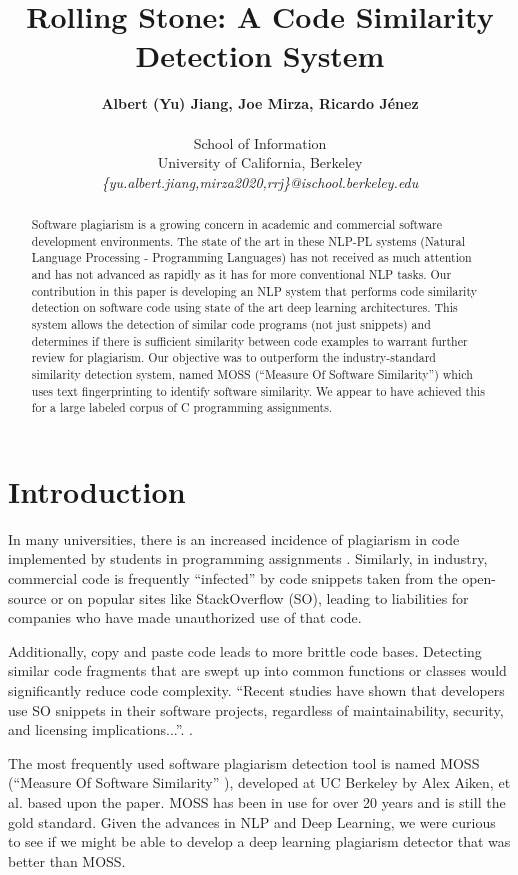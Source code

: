 \documentclass[twocolumn]{article}
\title{\Large \textbf{Rolling Stone: A Code Similarity Detection System}}
\author{\textbf{Albert (Yu) Jiang, Joe Mirza, Ricardo J\'enez} \\
\\
School of Information \\
University of California, Berkeley \\
\textit{\{yu.albert.jiang,mirza2020,rrj\}@ischool.berkeley.edu} \\
}
\date{}
\begin{document}
\maketitle


\begin{abstract}
Software plagiarism is a growing concern in academic and commercial software development environments. The state of the art in these NLP-PL systems (Natural Language Processing - Programming Languages) has not received as much attention and has not advanced as rapidly as it has for more conventional NLP tasks. Our contribution in this paper is developing an NLP system that performs code similarity detection on software code using state of the art deep learning architectures. This system allows the detection of similar code programs (not just snippets) and determines if there is sufficient similarity between code examples to warrant further review for plagiarism. Our objective was to outperform the industry-standard similarity detection system, named MOSS (“Measure Of Software Similarity”) which uses text fingerprinting\cite{schleimer} to identify software similarity. We appear to have achieved this for a large labeled corpus of C programming assignments.
\end{abstract}


\section{\large Introduction}
In many universities, there is an increased incidence of plagiarism in code implemented by students in programming assignments \cite{bowyer}. Similarly, in industry, commercial code is frequently “infected” by code snippets taken from the open-source or on popular sites like StackOverflow (SO), leading to liabilities for companies who have made unauthorized use of that code.

Additionally, copy and paste code leads to more brittle code bases. Detecting similar code fragments that are swept up into common functions or classes would significantly reduce code complexity. “Recent studies have shown that developers use SO snippets in their software projects, regardless of maintainability, security, and licensing implications...”. \cite{baltes}.

The most frequently used software plagiarism detection tool is named MOSS (“Measure Of Software Similarity” \cite{schleimer}), developed at UC Berkeley by Alex Aiken, et al. based upon the paper\cite{schleimer}. MOSS has been in use for over 20 years and is still the gold standard. Given the advances in NLP and Deep Learning, we were curious to see if we might be able to develop a deep learning plagiarism detector that was better than MOSS.
\end{document}
